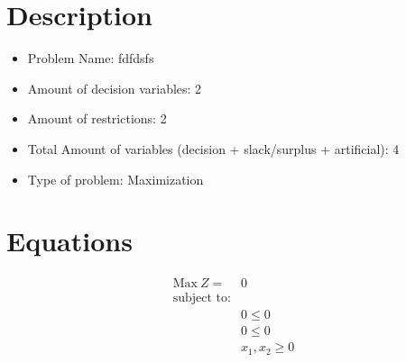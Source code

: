\section*{Description}
\begin{itemize}
\item Problem Name: fdfdsfs
\item Amount of decision variables: 2
\item Amount of restrictions: 2
\item Total Amount of variables (decision + slack/surplus + artificial): 4
\item Type of problem: Maximization
\end{itemize}
\section*{Equations}
\begin{align*}
\text{Max}\ Z = {} & 0 \\ 
\text{subject to:} & \\ 
& 0 \leq 0 \\ 
& 0 \leq 0 \\ 
& x_{1}, x_{2} \geq 0 
\end{align*}

